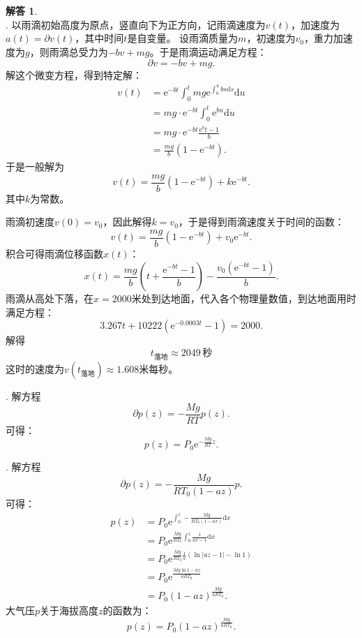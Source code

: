 \documentclass[12pt,UTF8]{ctexbook}
\newcommand{\e}{\mathrm{e}}
\theoremstyle{definition}
\newtheorem*{so}{解答}
\theoremstyle{plain}
\begin{document}
\begin{so}
    \mbox{} \\
    . 以雨滴初始高度为原点，竖直向下为正方向，记雨滴速度为$v(t)$，加速度为$a(t) = \partial v (t)$，其中时间$t$是自变量。
    设雨滴质量为$m$，初速度为$v_0$，重力加速度为$g$，则雨滴总受力为$- bv + mg$。于是雨滴运动满足方程：
    $$ \partial v = - bv + mg.$$
    解这个微变方程，得到特定解：
    \begin{align*}
        v(t) &= \e^{-bt} \int_0^t mg \e^{\int_0^u bs\mathrm{d}s} \mathrm{d}u\\
        &= mg \cdot \e^{-bt} \int_0^t \e^{bu}\mathrm{d}u \\
        &= mg \cdot \e^{-bt} \frac{\e^bt - 1}{b} \\
        &= \frac{mg}{b}\left(1 - \e^{-bt}\right).
    \end{align*}
    于是一般解为
    $$ v(t) = \frac{mg}{b}\left(1 - \e^{-bt}\right) + k\e^{-bt}. $$
    其中$k$为常数。
    
    雨滴初速度$v(0) = v_0$，因此解得$k = v_0$，于是得到雨滴速度关于时间的函数：
    $$ v(t) = \frac{mg}{b}\left(1 - \e^{-bt}\right) + v_0\e^{-bt}. $$
    积合可得雨滴位移函数$x(t)$：
    $$ x(t) = \frac{mg}{b}\left(t + \frac{\e^{-bt} - 1}{b}\right) - \frac{v_0\left(\e^{-bt} - 1\right)}{b}. $$
    雨滴从高处下落，在$x=2000$米处到达地面，代入各个物理量数值，到达地面用时满足方程：
    $$ 3.267t + 10222 \left(\e^{-0.0003t} - 1\right) = 2000.  $$
    解得
    $$ t_{\text{落地}} \approx 2049\,\mbox{秒} $$
    这时的速度为$v(t_{\text{落地}}) \approx 1.608$米每秒。

    . 解方程
    $$ \partial p(z) = -\frac{Mg}{RT} p(z). $$
    可得：
    $$ p(z) = P_0\e^{-\frac{Mg}{RT}z}.$$

    . 解方程
    $$ \partial p(z) = -\frac{Mg}{RT_0(1 - az)} p. $$
    可得：
    \begin{align*}
        p(z) &= P_0\e^{\int_0^z -\frac{Mg}{RT_0(1 - ax)}\mathrm{d}x} \\
        &= P_0\e^{\frac{Mg}{RT_0}\int_0^z \frac{1}{ax - 1}\mathrm{d}x} \\
        &= P_0\e^{\frac{Mg}{RT_0}\frac{1}{a}\left(\ln{|az - 1|} - \ln{1}\right)} \\
        &= P_0\e^{\frac{Mg\ln{1 - az}}{aRT_0}} \\
        &= P_0 (1 - az)^{\frac{Mg}{aRT_0}}.
    \end{align*}
    大气压$p$关于海拔高度$z$的函数为：
    $$ p(z) = P_0 (1 - az)^{\frac{Mg}{aRT_0}}.$$


\end{so}
\end{document}
